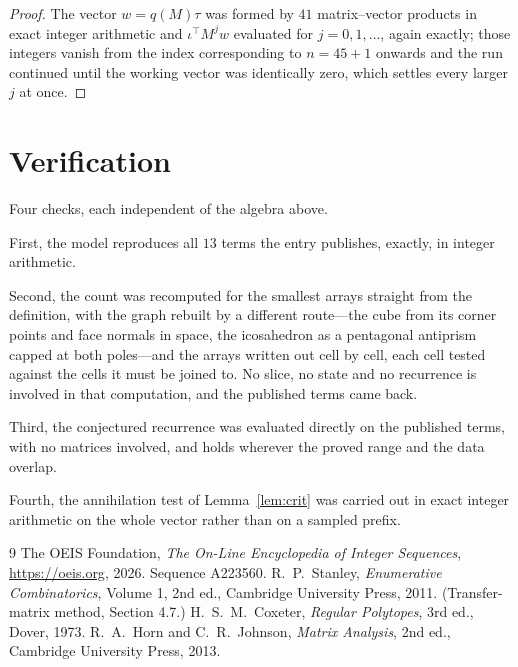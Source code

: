\documentclass[11pt,a4paper]{article}
\theoremstyle{plain}
\theoremstyle{definition}
\begin{document}
\begin{proof}
The vector $w=q(M)\tau$ was formed by $41$ matrix--vector products in exact integer
arithmetic and $\iota^{\!\top}M^{j}w$ evaluated for $j=0,1,\dots$, again exactly; those
integers vanish from the index corresponding to $n=45+1$ onwards and the run continued
until the working vector was identically zero, which settles every larger $j$ at once.
\end{proof}

\section{Verification}

Four checks, each independent of the algebra above.

First, the model reproduces all $13$ terms the entry publishes, exactly, in integer
arithmetic.

Second, the count was recomputed for the smallest arrays straight from the definition, with the
graph rebuilt by a different route---the cube from its corner points and face normals in space,
the icosahedron as a pentagonal antiprism capped at both poles---and the arrays written out cell
by cell, each cell tested against the cells it must be joined to. No slice, no state and no
recurrence is involved in that computation, and the published terms came back.

Third, the conjectured recurrence was evaluated directly on the published terms, with no
matrices involved, and holds wherever the proved range and the data overlap.

Fourth, the annihilation test of Lemma~\ref{lem:crit} was carried out in exact integer
arithmetic on the whole vector rather than on a sampled prefix.

\begin{thebibliography}{9}
 The OEIS Foundation, \emph{The On-Line Encyclopedia of Integer
Sequences}, \url{https://oeis.org}, 2026. Sequence A223560.
 R.~P.~Stanley, \emph{Enumerative Combinatorics}, Volume 1, 2nd ed.,
Cambridge University Press, 2011. (Transfer-matrix method, Section 4.7.)
 H.~S.~M.~Coxeter, \emph{Regular Polytopes}, 3rd ed., Dover, 1973.
 R.~A.~Horn and C.~R.~Johnson, \emph{Matrix Analysis}, 2nd ed., Cambridge
University Press, 2013.
\end{thebibliography}
\end{document}
